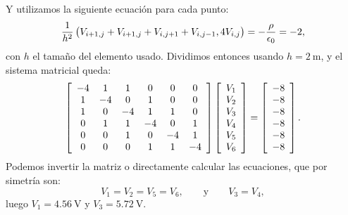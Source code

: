 \documentclass[
  11pt,
  letterpaper,
   answers
  ]{exam}
\begin{document}
\begin{questions}
\begin{solution}
\begin{parts}
\begin{center}
      \label{fig:dfm}
    \end{center}
    Y utilizamos la siguiente ecuación para cada punto:
    \begin{equation}
      \frac{1}{h^2}\del{V_{i+1, j} + V_{i+1, j} + V_{i, j+1} + V_{i, j-1}, 4V_{i, j}} = -\frac{\rho}{\epsilon_0} = -2, \label{eq:five-point}
    \end{equation}
    con $h$ el tamaño del elemento usado. Dividimos entonces usando $h=\qty{2}{\m}$, y el sistema matricial queda:
    \begin{equation}
      \sbr{
      \begin{array}{cccccc}
        -4 & 1 & 1 & 0 & 0 & 0 \\
        1 & -4 & 0 & 1 & 0 & 0 \\
        1 & 0 & -4 & 1 & 1 & 0 \\
        0 & 1 & 1 & -4 & 0 & 1 \\
        0 & 0 & 1 & 0 & -4 & 1 \\
        0 & 0 & 0 & 1 & 1 & -4 \\
      \end{array}} \sbr{\begin{array}{c} V_1 \\ V_2 \\ V_3 \\ V_4 \\ V_5 \\ V_6 \end{array}} =\sbr{\begin{array}{c} -8 \\ -8 \\ -8 \\ -8 \\ -8 \\ -8\end{array}}.
    \end{equation}
    Podemos invertir la matriz o directamente calcular las ecuaciones, que por simetría son:
    \begin{equation}
      V_1 = V_2 = V_5 = V_6, \qquad \text{y} \qquad V_3 = V_4,
    \end{equation}
    luego $V_1 = \qty{4.56}{\volt}$ y $V_3=\qty{5.72}{\volt}$.
    \end{parts}
\end{solution}
\end{questions}
 
\end{document}
